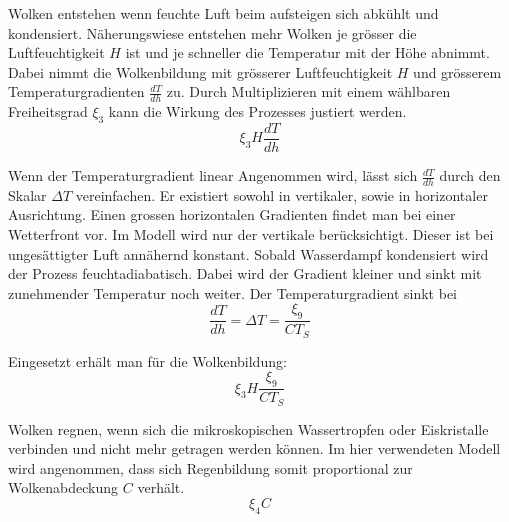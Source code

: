 \begin{refsection}

Wolken entstehen wenn feuchte Luft beim aufsteigen sich abkühlt und kondensiert. Näherungswiese entstehen mehr Wolken je grösser die Luftfeuchtigkeit $H$ ist und je schneller die Temperatur mit der Höhe abnimmt.
Dabei nimmt die Wolkenbildung mit grösserer Luftfeuchtigkeit $H$ und grösserem Temperaturgradienten $\frac{dT}{dh}$ zu. Durch Multiplizieren mit einem wählbaren Freiheitsgrad $\xi_3$ kann die Wirkung des Prozesses justiert werden. 
\begin{equation}
\xi_3 H \frac{dT}{dh}
\end{equation}

Wenn der Temperaturgradient linear Angenommen wird, lässt sich $\frac{dT}{dh}$ durch den Skalar $\Delta T $ vereinfachen.
Er existiert sowohl in vertikaler, sowie in horizontaler Ausrichtung. Einen grossen horizontalen Gradienten findet man bei einer Wetterfront vor. Im Modell wird nur der vertikale berücksichtigt. Dieser ist bei ungesättigter Luft annähernd konstant. Sobald Wasserdampf kondensiert wird der Prozess feuchtadiabatisch. Dabei wird der Gradient kleiner und sinkt mit zunehmender Temperatur noch weiter.
Der Temperaturgradient sinkt bei 
\begin{equation}
\frac{dT}{dh} = \Delta T = \frac{\xi_9}{C T_S} 
\end{equation}

Eingesetzt erhält man für die Wolkenbildung:
\begin{equation}
\xi_3 H \frac{\xi_9}{C T_S}
\end{equation}

Wolken regnen, wenn sich die mikroskopischen Wassertropfen oder Eiskristalle verbinden und nicht mehr getragen werden können. Im hier verwendeten Modell wird angenommen, dass sich Regenbildung somit proportional zur Wolkenabdeckung $C$ verhält.
\begin{equation}
\xi_4 C
\end{equation}


\end{refsection}
